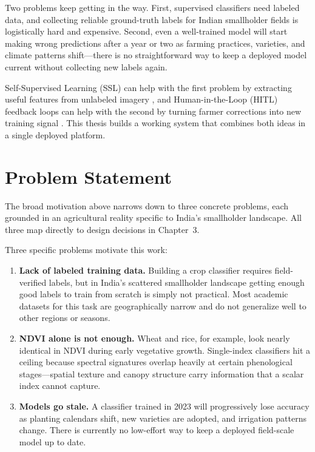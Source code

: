 \documentclass[12pt,a4paper,oneside]{report}
\begin{document}
Two problems keep getting in the way. First, supervised classifiers need labeled
data, and collecting reliable ground-truth labels for Indian smallholder fields is
logistically hard and expensive. Second, even a well-trained model will start
making wrong predictions after a year or two as farming practices, varieties, and
climate patterns shift—there is no straightforward way to keep a deployed model
current without collecting new labels again.

Self-Supervised Learning (SSL) can help with the first problem by extracting
useful features from unlabeled imagery \cite{chen2020simclr, ayush2021geography},
and Human-in-the-Loop (HITL) feedback loops can help with the second by turning
farmer corrections into new training signal \cite{settles2009active, monarch2021hitl}.
This thesis builds a working system that combines both ideas in a single deployed
platform.

\section{Problem Statement}

The broad motivation above narrows down to three concrete problems, each grounded in an agricultural reality specific to India's smallholder landscape. All three map directly to design decisions in Chapter~3.

Three specific problems motivate this work:

\begin{enumerate}
  \item \textbf{Lack of labeled training data.} Building a crop classifier requires
        field-verified labels, but in India's scattered smallholder landscape getting
        enough good labels to train from scratch is simply not practical. Most academic
        datasets for this task are geographically narrow and do not generalize well to
        other regions or seasons.

  \item \textbf{NDVI alone is not enough.} Wheat and rice, for example, look nearly
        identical in NDVI during early vegetative growth. Single-index classifiers
        hit a ceiling because spectral signatures overlap heavily at certain phenological
        stages—spatial texture and canopy structure carry information that a scalar
        index cannot capture.

  \item \textbf{Models go stale.} A classifier trained in 2023 will progressively
        lose accuracy as planting calendars shift, new varieties are adopted, and
        irrigation patterns change. There is currently no low-effort way to keep a
        deployed field-scale model up to date.
\end{enumerate}
\end{document}
